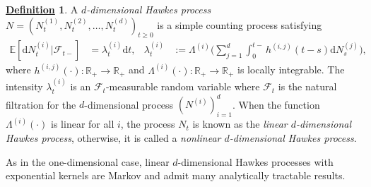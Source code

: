 \documentclass[12pt]{book}
\numberwithin{equation}{chapter}
\theoremstyle{plain}
\numberwithin{theorem}{section}
\newtheorem{lemma}[theorem]{\underline{Lemma}}   		%
\theoremstyle{definition}
\newtheorem{definition}[theorem]{\underline{Definition}}
\numberwithin{exercise}{chapter}
\newcommand{\<}{\langle}
\renewcommand{\>}{\rangle}
\renewcommand{\(}{\left(}
\renewcommand{\)}{\right)}
\renewcommand{\[}{\left[}
\renewcommand{\]}{\right]}
\newcommand\Eb{\mathds{E}}
\newcommand\Rb{\mathds{R}}
\newcommand\Fc{\mathscr{F}}
\newcommand\Lam{\Lambda}
\newcommand\lam{\lambda}
\newcommand\dd{\mathrm{d}}
\newcommand\ee{\mathrm{e}}
\begin{document}
\begin{definition}
A \emph{$d$-dimensional Hawkes process} $N=(N_t^{(1)}, N_t^{(2)}, \ldots, N_t^{(d)})_{t \geq 0}$ is a simple counting process satisfying
\begin{align}
\Eb[ \dd N_t^{(i)} | \Fc_{t-} ]
	&=	\lam_t^{(i)} \dd t , &
\lambda_t^{(i)}
	&:=	\Lam^{(i)} \Big( \sum_{j=1}^d \int_0^{t-} h^{(i,j)}(t-s) \dd N_s^{(j)} \Big), \label{eq:lambda}
\end{align}
where $h^{(i,j)}(\cdot):\Rb_+ \rightarrow \Rb_+$ and $\Lam^{(i)}(\cdot):\Rb_+ \to \Rb_+$ is locally integrable.  The intensity $\lambda_t^{(i)}$ is an $\Fc_t$-measurable random variable where $\Fc_t$ is the natural filtration for the $d$-dimensional process $(N^{(i)})_{i=1}^d$.  When the function $\Lam^{(i)}(\cdot)$ is linear for all $i$, the process $N_t$ is known as the \emph{linear $d$-dimensional Hawkes process}, otherwise, it is called a \emph{nonlinear $d$-dimensional Hawkes process}.
\end{definition}

\noindent
As in the one-dimensional case, linear $d$-dimensional Hawkes processes with exponential kernels are Markov and admit many analytically tractable results.

%
\end{document}
